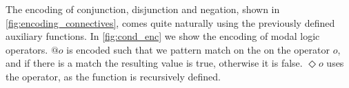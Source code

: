 \documentclass[sigplan,screen]{acmart}
\begin{document}
The encoding of conjunction, disjunction and negation, shown in \cref{fig:encoding_connectives}, comes quite naturally using the previously defined auxiliary functions.
In \cref{fig:cond_enc} we show the encoding of modal logic operators.
$@o$ is encoded such that we pattern match on the on the operator $o$, and if there is a match the resulting value is true, otherwise it is false. $\Diamond o$ uses the \fix operator, as the function is recursively defined. 
\end{document}
